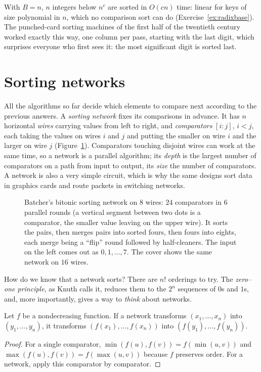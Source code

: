 With $B=n$, $n$ integers below $n^c$ are sorted in $O(cn)$ time: linear for keys of size polynomial in $n$, which no comparison sort can do (Exercise~\ref{ex:radixbase}). The
punched-card sorting machines of the first half of the twentieth century worked exactly this way, one column per pass, starting with the last digit, which surprises
everyone who first sees it: the most significant digit is sorted last.

\section{Sorting networks}\label{sec:networks}

All the algorithms so far decide which elements to compare next according to the previous answers. A \emph{sorting network} fixes its comparisons in advance. It has $n$
horizontal \emph{wires} carrying values from left to right, and \emph{comparators} $[i:j]$, $i<j$, each taking the values on wires $i$ and $j$ and putting the smaller on wire $i$ and
the larger on wire $j$ (Figure~\ref{fig:bitonic}). Comparators touching disjoint wires can work at the same time, so a network is a parallel algorithm; its \emph{depth} is the
largest number of comparators on a path from input to output, its \emph{size} the number of comparators. A network is also a very simple circuit, which is why the same
designs sort data in graphics cards and route packets in switching networks.

\begin{figure}[ht]
\centering
{}
\caption{Batcher's bitonic sorting network on $8$ wires: $24$ comparators in $6$ parallel rounds (a vertical segment between two dots is a comparator, the smaller
value leaving on the upper wire). It sorts the pairs, then merges pairs into sorted fours, then fours into eights, each merge being a ``flip'' round followed by
half-cleaners. The input on the left comes out as $0,1,\dots,7$. The cover shows the same network on $16$ wires.}
\label{fig:bitonic}
\end{figure}

How do we know that a network sorts? There are $n!$ orderings to try. The \emph{zero--one principle}, as Knuth calls it, reduces them to the $2^n$ sequences of $0$s and $1$s,
and, more importantly, gives a way to \emph{think} about networks.

\begin{lemma}\label{lem:monotone}
Let $f$ be a nondecreasing function. If a network transforms $(x_1,\dots,x_n)$ into $(y_1,\dots,y_n)$, it transforms $(f(x_1),\dots,f(x_n))$ into $(f(y_1),\dots,f(y_n))$.
\end{lemma}
\begin{proof}
For a single comparator, $\min(f(u),f(v))=f(\min(u,v))$ and $\max(f(u),f(v))=f(\max(u,v))$ because $f$ preserves order. For a network, apply this comparator by comparator.
\end{proof}

